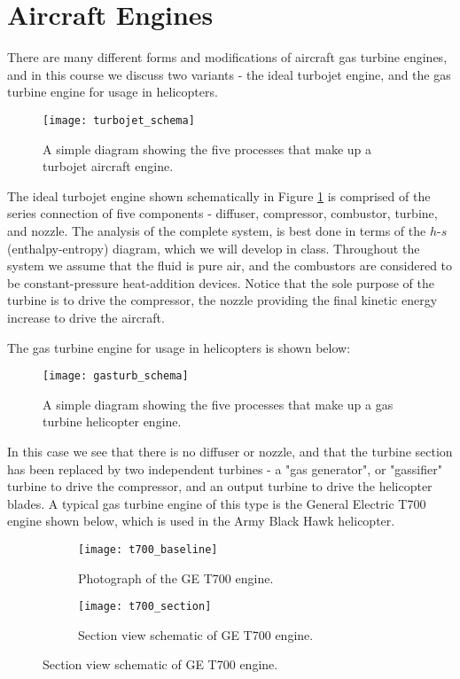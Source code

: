 \section{Aircraft Engines}
There are many different forms and modifications of aircraft gas turbine engines, and in this course we discuss two variants - the ideal turbojet engine, and the gas turbine engine for usage in helicopters.

\begin{figure}[H]
  \centering
  \texttt{[image: turbojet\_schema]}
  \caption{A simple diagram showing the five processes that make up a turbojet aircraft engine.}
  \label{fig:turbojet_schema}
\end{figure}

The ideal turbojet engine shown schematically in Figure \ref{fig:turbojet_schema} is comprised of the series connection of five components - diffuser, compressor, combustor, turbine, and nozzle. The analysis of the complete system, is best done in terms of the $h$-$s$ (enthalpy-entropy) diagram, which we will develop in class. Throughout the system we assume that the fluid is pure air, and the combustors are considered to be constant-pressure heat-addition devices. Notice that the sole purpose of the turbine is to drive the compressor, the nozzle providing the final kinetic energy increase to drive the aircraft.

The gas turbine engine for usage in helicopters is shown below:

\begin{figure}[H]
  \centering
  \texttt{[image: gasturb\_schema]}
  \caption{A simple diagram showing the five processes that make up a gas turbine helicopter engine.}
  \label{fig:gasturb_schema}
\end{figure}

In this case we see that there is no diffuser or nozzle, and that the turbine section has been replaced by two independent turbines - a "gas generator", or "gassifier" turbine to drive the compressor, and an output turbine to drive the helicopter blades. A typical gas turbine engine of this type is the General Electric T700 engine shown below, which is used in the Army Black Hawk helicopter.

\begin{figure}[H]
\centering
\begin{subfigure}{.5\textwidth}
  \centering
  \texttt{[image: t700\_baseline]}
  \caption{Photograph of the GE T700 engine.}
  \label{fig:t700_baseline}
\end{subfigure}%
\begin{subfigure}{.5\textwidth}
  \centering
  \texttt{[image: t700\_section]}
  \caption{Section view schematic of GE T700 engine.}
  \label{fig:t700_section}
\end{subfigure}
\end{figure}

